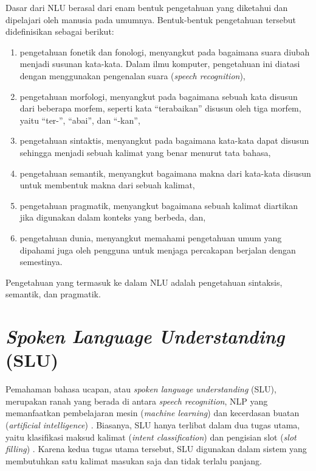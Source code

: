 Dasar dari NLU berasal dari enam bentuk pengetahuan yang diketahui dan dipelajari oleh manusia pada umumnya. Bentuk-bentuk pengetahuan tersebut didefinisikan sebagai berikut: \parencite{allen1995natural}

\begin{enumerate}
	\item pengetahuan fonetik dan fonologi, menyangkut pada bagaimana suara diubah menjadi susunan kata-kata. Dalam ilmu komputer, pengetahuan ini diatasi dengan menggunakan pengenalan suara (\textit{speech recognition}),
	\item pengetahuan morfologi, menyangkut pada bagaimana sebuah kata disusun dari beberapa morfem, seperti kata “terabaikan” disusun oleh tiga morfem, yaitu “ter-”, “abai”, dan “-kan”,
	\item pengetahuan sintaktis, menyangkut pada bagaimana kata-kata dapat disusun sehingga menjadi sebuah kalimat yang benar menurut tata bahasa,
	\item pengetahuan semantik, menyangkut bagaimana makna dari kata-kata disusun untuk membentuk makna dari sebuah kalimat,
	\item pengetahuan pragmatik, menyangkut bagaimana sebuah kalimat diartikan jika digunakan dalam konteks yang berbeda, dan,
	\item pengetahuan dunia, menyangkut memahami pengetahuan umum yang dipahami juga oleh pengguna untuk menjaga percakapan berjalan dengan semestinya.
\end{enumerate}

Pengetahuan yang termasuk ke dalam NLU adalah pengetahuan sintaksis, semantik, dan pragmatik.

\section{\textit{Spoken Language Understanding} (SLU)}

Pemahaman bahasa ucapan, atau \textit{spoken language understanding} (SLU), merupakan ranah yang berada di antara \textit{speech recognition}, NLP yang memanfaatkan pembelajaran mesin (\textit{machine learning}) dan kecerdasan buatan (\textit{artificial intelligence}) \parencite{tur2011spoken}. Biasanya, SLU hanya terlibat dalam dua tugas utama, yaitu klasifikasi maksud kalimat (\textit{intent classification}) dan pengisian slot (\textit{slot filling}) \parencite{goo2018slot}. Karena kedua tugas utama tersebut, SLU digunakan dalam sistem yang membutuhkan satu kalimat masukan saja dan tidak terlalu panjang.

